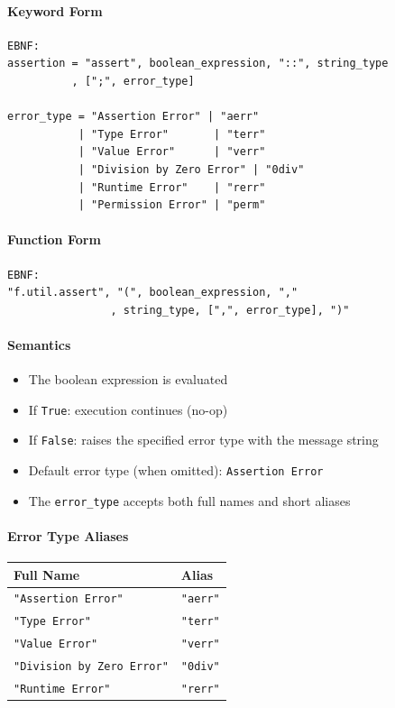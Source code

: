 \paragraph{Keyword Form}
\begin{verbatim}
EBNF:
assertion = "assert", boolean_expression, "::", string_type
          , [";", error_type]

error_type = "Assertion Error" | "aerr"
           | "Type Error"       | "terr"
           | "Value Error"      | "verr"
           | "Division by Zero Error" | "0div"
           | "Runtime Error"    | "rerr"
           | "Permission Error" | "perm"
\end{verbatim}

\paragraph{Function Form}
\begin{verbatim}
EBNF:
"f.util.assert", "(", boolean_expression, ","
                , string_type, [",", error_type], ")"
\end{verbatim}

\paragraph{Semantics}
\begin{itemize}
\item The boolean expression is evaluated
\item If \texttt{True}: execution continues (no-op)
\item If \texttt{False}: raises the specified error type with the message string
\item Default error type (when omitted): \texttt{Assertion Error}
\item The \texttt{error\_type} accepts both full names and short aliases
\end{itemize}

\paragraph{Error Type Aliases}
\begin{center}
\begin{tabular}{ll}
Full Name & Alias \\ \hline
\texttt{"Assertion Error"} & \texttt{"aerr"} \\
\texttt{"Type Error"} & \texttt{"terr"} \\
\texttt{"Value Error"} & \texttt{"verr"} \\
\texttt{"Division by Zero Error"} & \texttt{"0div"} \\
\texttt{"Runtime Error"} & \texttt{"rerr"} \\
\end{tabular}
\end{center}

